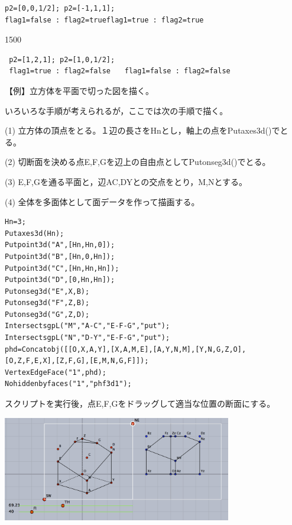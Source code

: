 \documentclass[papersize,a4paper,12pt,uplatex]{jsarticle}
\begin{document}
\begin{description}
 \begin{verbatim}
p2=[0,0,1/2]; p2=[-1,1,1];
flag1=false : flag2=trueflag1=true : flag2=true 
\end{verbatim}

\newpage%
\begin{layer}{150}{0}
\end{layer}

 \begin{verbatim} 
 p2=[1,2,1]; p2=[1,0,1/2];
 flag1=true : flag2=false　　flag1=false : flag2=false 
\end{verbatim}

\vspace{30mm}
【例】立方体を平面で切った図を描く。

 いろいろな手順が考えられるが，ここでは次の手順で描く。
 
 (1) 立方体の頂点をとる。１辺の長さをHnとし，軸上の点をPutaxes3d()でとる。

(2) 切断面を決める点E,F,Gを辺上の自由点としてPutonseg3d()でとる。

(3) E,F,Gを通る平面と，辺AC,DYとの交点をとり，M,Nとする。

(4) 全体を多面体として面データを作って描画する。
\begin{verbatim}
Hn=3;
Putaxes3d(Hn);
Putpoint3d("A",[Hn,Hn,0]);
Putpoint3d("B",[Hn,0,Hn]);
Putpoint3d("C",[Hn,Hn,Hn]);
Putpoint3d("D",[0,Hn,Hn]);
Putonseg3d("E",X,B); 
Putonseg3d("F",Z,B); 
Putonseg3d("G",Z,D); 
IntersectsgpL("M","A-C","E-F-G","put"); 
IntersectsgpL("N","D-Y","E-F-G","put"); 
phd=Concatobj([[O,X,A,Y],[X,A,M,E],[A,Y,N,M],[Y,N,G,Z,O],
[O,Z,F,E,X],[Z,F,G],[E,M,N,G,F]]);
VertexEdgeFace("1",phd);
Nohiddenbyfaces("1","phf3d1"); 
\end{verbatim}
スクリプトを実行後，点E,F,Gをドラッグして適当な位置の断面にする。

\begin{center}\includegraphics[bb=0 0 713.04 327.02 , width=10cm]{Fig/IntersectsgpL0.pdf}\end{center}


\end{description}
\end{document}
